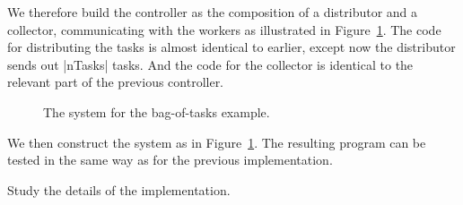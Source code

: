 We therefore build the controller as the composition of a distributor and a
collector, communicating with the workers as illustrated in
Figure~\ref{fig:trapezium-bag-system}. 
%
The code for distributing the tasks is almost identical to earlier, except now
the distributor sends out |nTasks| tasks.  And the code for the collector is
identical to the relevant part of the previous controller. 

\begin{figure}
\begin{center}
\end{center}
\caption{The system for the bag-of-tasks  example.}
\label{fig:trapezium-bag-system}
\end{figure}



We then construct the system as   in
Figure~\ref{fig:trapezium-bag-system}.   The resulting program can
be tested in the same way as for the previous implementation. 

\begin{instruction}
Study the details of the implementation.
\end{instruction}
